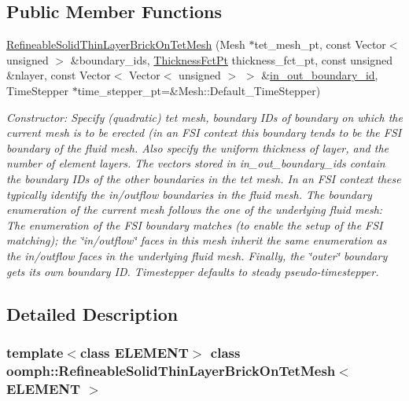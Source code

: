 \subsection*{Public Member Functions}
\begin{DoxyCompactItemize}
\item 
\hyperlink{classoomph_1_1RefineableSolidThinLayerBrickOnTetMesh_adda15e0208b20e1c1f5404c27850fb1b}{Refineable\+Solid\+Thin\+Layer\+Brick\+On\+Tet\+Mesh} (Mesh $\ast$tet\+\_\+mesh\+\_\+pt, const Vector$<$ unsigned $>$ \&boundary\+\_\+ids, \hyperlink{classoomph_1_1RefineableSolidThinLayerBrickOnTetMesh_a45af8cb1926cec40d597eb18b75b96da}{Thickness\+Fct\+Pt} thickness\+\_\+fct\+\_\+pt, const unsigned \&nlayer, const Vector$<$ Vector$<$ unsigned $>$ $>$ \&\hyperlink{classoomph_1_1ThinLayerBrickOnTetMesh_a3cfd55eb5bbd6801e9d4cd271e602cd8}{in\+\_\+out\+\_\+boundary\+\_\+id}, Time\+Stepper $\ast$time\+\_\+stepper\+\_\+pt=\&Mesh\+::\+Default\+\_\+\+Time\+Stepper)
\begin{DoxyCompactList}\small\item\em Constructor\+: Specify (quadratic) tet mesh, boundary I\+Ds of boundary on which the current mesh is to be erected (in an F\+SI context this boundary tends to be the F\+SI boundary of the fluid mesh. Also specify the uniform thickness of layer, and the number of element layers. The vectors stored in in\+\_\+out\+\_\+boundary\+\_\+ids contain the boundary I\+Ds of the other boundaries in the tet mesh. In an F\+SI context these typically identify the in/outflow boundaries in the fluid mesh. The boundary enumeration of the current mesh follows the one of the underlying fluid mesh\+: The enumeration of the F\+SI boundary matches (to enable the setup of the F\+SI matching); the \char`\"{}in/outflow\char`\"{} faces in this mesh inherit the same enumeration as the in/outflow faces in the underlying fluid mesh. Finally, the \char`\"{}outer\char`\"{} boundary gets its own boundary ID. Timestepper defaults to steady pseudo-\/timestepper. \end{DoxyCompactList}\end{DoxyCompactItemize}


\subsection{Detailed Description}
\subsubsection*{template$<$class E\+L\+E\+M\+E\+NT$>$\newline
class oomph\+::\+Refineable\+Solid\+Thin\+Layer\+Brick\+On\+Tet\+Mesh$<$ E\+L\+E\+M\+E\+N\+T $>$}

